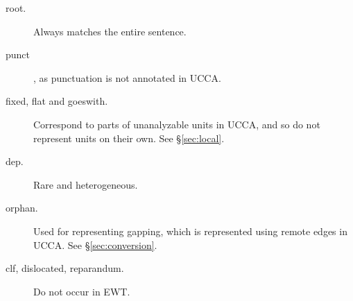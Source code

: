 \documentclass[11pt,a4paper]{article}
\begin{document}
\begin{description}
  \item[root.] Always matches the entire sentence.
  \item[punct], as punctuation is not annotated in UCCA.
  \item[fixed, flat and goeswith.] Correspond to parts of unanalyzable units in UCCA,
    and so do not represent units on their own. See \S\ref{sec:local}.
  \item[dep.] Rare and heterogeneous.
  \item[orphan.] Used for representing gapping, which is represented using remote edges in UCCA. See \S\ref{sec:conversion}.
  \item[clf, dislocated, reparandum.] Do not occur in EWT.
\end{description}



%
%
%
\end{document}
